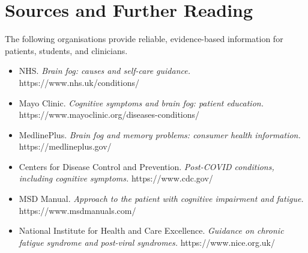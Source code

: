 \section*{Sources and Further Reading}
The following organisations provide reliable, evidence-based information for patients, students, and clinicians.

\begin{itemize}
    \item NHS. \textit{Brain fog: causes and self-care guidance.} https://www.nhs.uk/conditions/
    \item Mayo Clinic. \textit{Cognitive symptoms and brain fog: patient education.} https://www.mayoclinic.org/diseases-conditions/
    \item MedlinePlus. \textit{Brain fog and memory problems: consumer health information.} https://medlineplus.gov/
    \item Centers for Disease Control and Prevention. \textit{Post-COVID conditions, including cognitive symptoms.} https://www.cdc.gov/
    \item MSD Manual. \textit{Approach to the patient with cognitive impairment and fatigue.} https://www.msdmanuals.com/
    \item National Institute for Health and Care Excellence. \textit{Guidance on chronic fatigue syndrome and post-viral syndromes.} https://www.nice.org.uk/
\end{itemize}
